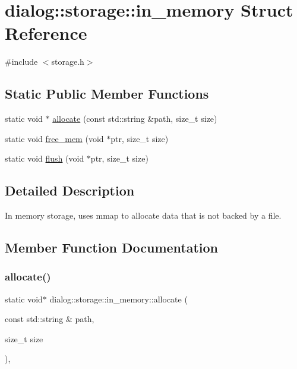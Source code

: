 \hypertarget{structdialog_1_1storage_1_1in__memory}{}\section{dialog\+:\+:storage\+:\+:in\+\_\+memory Struct Reference}
\label{structdialog_1_1storage_1_1in__memory}


{\ttfamily \#include $<$storage.\+h$>$}

\subsection*{Static Public Member Functions}
\begin{DoxyCompactItemize}
\item 
static void $\ast$ \hyperlink{structdialog_1_1storage_1_1in__memory_a0cf298a53915ebf358d46e864f54ad78}{allocate} (const std\+::string \&path, size\+\_\+t size)
\item 
static void \hyperlink{structdialog_1_1storage_1_1in__memory_af1a8517c282999c0f80fda59de3483d7}{free\+\_\+mem} (void $\ast$ptr, size\+\_\+t size)
\item 
static void \hyperlink{structdialog_1_1storage_1_1in__memory_a8c6edb151f7f3420cb14b567b5c88c64}{flush} (void $\ast$ptr, size\+\_\+t size)
\end{DoxyCompactItemize}


\subsection{Detailed Description}
In memory storage, uses mmap to allocate data that is not backed by a file. 

\subsection{Member Function Documentation}
\mbox{\label{structdialog_1_1storage_1_1in__memory_a0cf298a53915ebf358d46e864f54ad78}} 
\subsubsection{\texorpdfstring{allocate()}{allocate()}}
{\footnotesize\ttfamily static void$\ast$ dialog\+::storage\+::in\+\_\+memory\+::allocate (\begin{DoxyParamCaption}\item[{const std\+::string \&}]{path,  }\item[{size\+\_\+t}]{size }\end{DoxyParamCaption})\hspace{0.3cm}{\ttfamily [inline]}, {\ttfamily [static]}}

